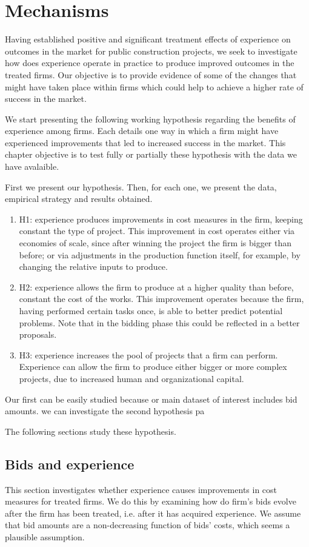 \chapter{Mechanisms}
Having established positive and significant treatment effects of  experience on outcomes in the market for public construction projects, we seek to investigate how does experience operate in practice to produce improved outcomes in the treated firms. Our objective is to provide evidence of some of the changes that might have taken place within firms which could help to achieve a higher rate of success in the market.

We start presenting the following working hypothesis regarding the benefits of experience among firms. Each details one way in which a firm might have experienced improvements that led to increased success in the market. This chapter objective is to test fully or partially these hypothesis with the data we have avalaible.

First we present our hypothesis. Then, for each one, we present the data, empirical strategy and results obtained.

\begin{enumerate}
  \item{H1}: experience produces improvements in cost measures in the firm, keeping constant the type of project. This improvement in cost operates either via economies of scale, since after winning the project the firm is bigger than before; or via adjustments in the production function itself, for example, by changing the relative inputs to produce.
  \item{H2}: experience allows the firm to produce at a higher quality than before, constant the cost of the works. This improvement operates because the firm, having performed certain tasks once, is able to better predict potential problems. Note that in the bidding phase this could be reflected in a better proposals.
  \item{H3}: experience increases the pool of projects that a firm can perform. Experience can allow the firm to produce either bigger or more complex projects, due to increased human and organizational capital.
\end{enumerate}

Our first can be easily studied because or main dataset of interest includes bid amounts. we can investigate the second hypothesis pa

The following sections study these hypothesis.

\section{Bids and experience}
This section investigates whether experience causes improvements in cost measures for treated firms. We do this by examining how do firm's bids evolve after the firm has been treated, i.e. after it has acquired experience. We assume that bid amounts are a non-decreasing function of bids' costs, which seems a plausible assumption.

